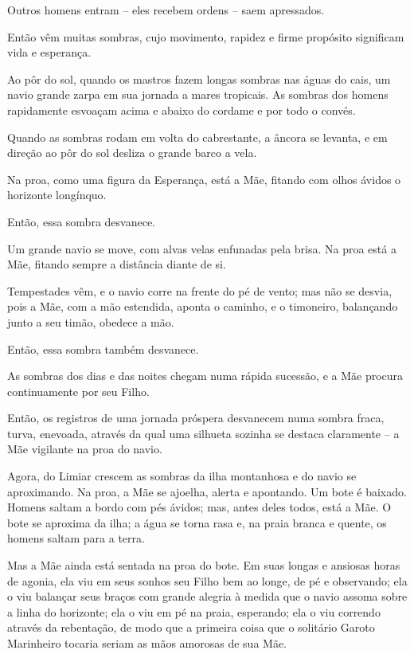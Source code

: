 Outros homens entram -- eles recebem ordens -- saem apressados.

\smallskip
Então vêm muitas sombras, cujo movimento, rapidez e firme propósito
significam vida e esperança.

\smallskip
Ao pôr do sol, quando os mastros fazem longas sombras nas águas do cais,
um navio grande zarpa em sua jornada a mares tropicais. As sombras dos
homens rapidamente esvoaçam acima e abaixo do cordame e por todo o
convés.

Quando as sombras rodam em volta do cabrestante, a âncora se levanta, e
em direção ao pôr do sol desliza o grande barco a vela.

Na proa, como uma figura da Esperança, está a Mãe, fitando com olhos
ávidos o horizonte longínquo.

Então, essa sombra desvanece.

\smallskip
Um grande navio se move, com alvas velas enfunadas pela brisa. Na proa
está a Mãe, fitando sempre a distância diante de si.

Tempestades vêm, e o navio corre na frente do pé de vento; mas não se
desvia, pois a Mãe, com a mão estendida, aponta o caminho, e o
timoneiro, balançando junto a seu timão, obedece a mão.

Então, essa sombra também desvanece.

\smallskip
As sombras dos dias e das noites chegam numa rápida sucessão, e a Mãe
procura continuamente por seu Filho.

\smallskip
Então, os registros de uma jornada próspera desvanecem numa sombra
fraca, turva, enevoada, através da qual uma silhueta sozinha se destaca
claramente -- a Mãe vigilante na proa do navio.

\smallskip
Agora, do Limiar crescem as sombras da ilha montanhosa e do navio se
aproximando. Na proa, a Mãe se ajoelha, alerta e apontando. Um bote é
baixado. Homens saltam a bordo com pés ávidos; mas, antes deles todos,
está a Mãe. O bote se aproxima da ilha; a água se torna rasa e, na praia
branca e quente, os homens saltam para a terra.

Mas a Mãe ainda está sentada na proa do bote. Em suas longas e ansiosas
horas de agonia, ela viu em seus sonhos seu Filho bem ao longe, de pé e
observando; ela o viu balançar seus braços com grande alegria à medida
que o navio assoma sobre a linha do horizonte; ela o viu em pé na praia,
esperando; ela o viu correndo através da rebentação, de modo que a
primeira coisa que o solitário Garoto Marinheiro tocaria seriam as mãos
amorosas de sua Mãe.

